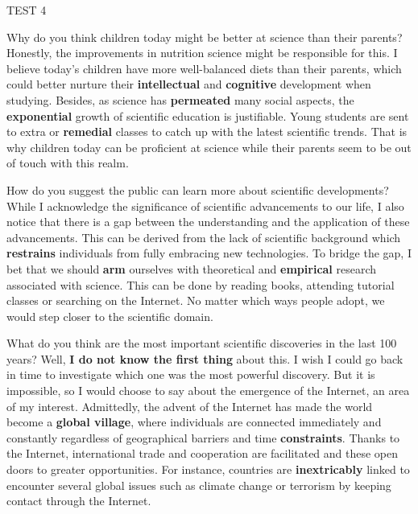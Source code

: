 \begin{glossarymc}[Cambridge 15]
\begin{test}{TEST 4}
    \begin{qa}{Why do you think children today might be better at science than their parents?}
    Honestly, the improvements in nutrition science might be responsible for this. I believe today’s children have more well-balanced diets than their parents, which could better nurture their \textbf{intellectual} and \textbf{cognitive} development when studying. Besides, as science has \textbf{permeated} many social aspects, the \textbf{exponential} growth of scientific education is justifiable. Young students are sent to extra or \textbf{remedial} classes to catch up with the latest scientific trends. That is why children today can be proficient at science while their parents seem to be out of touch with this realm.
    \end{qa}

    \begin{qa}{How do you suggest the public can learn more about scientific developments?}
    While I acknowledge the significance of scientific advancements to our life, I also notice that there is a gap between the understanding and the application of these advancements. This can be derived from the lack of scientific background which \textbf{restrains} individuals from fully embracing new technologies. To bridge the gap, I bet that we should \textbf{arm} ourselves with theoretical and \textbf{empirical} research associated with science. This can be done by reading books, attending tutorial classes or searching on the Internet. No matter which ways people adopt, we would step closer to the scientific domain.
    \end{qa}

    \begin{qa}{What do you think are the most important scientific discoveries in the last 100 years?}
    Well, \textbf{I do not know the first thing} about this. I wish I could go back in time to investigate which one was the most powerful discovery. But it is impossible, so I would choose to say about the emergence of the Internet, an area of my interest. Admittedly, the advent of the Internet has made the world become a \textbf{global village}, where individuals are connected immediately and constantly regardless of geographical barriers and time \textbf{constraints}. Thanks to the Internet, international trade and cooperation are facilitated and these open doors to greater opportunities. For instance, countries are \textbf{inextricably} linked to encounter several global issues such as climate change or terrorism by keeping contact through the Internet.
    \end{qa}


\end{test}
\end{glossarymc}
